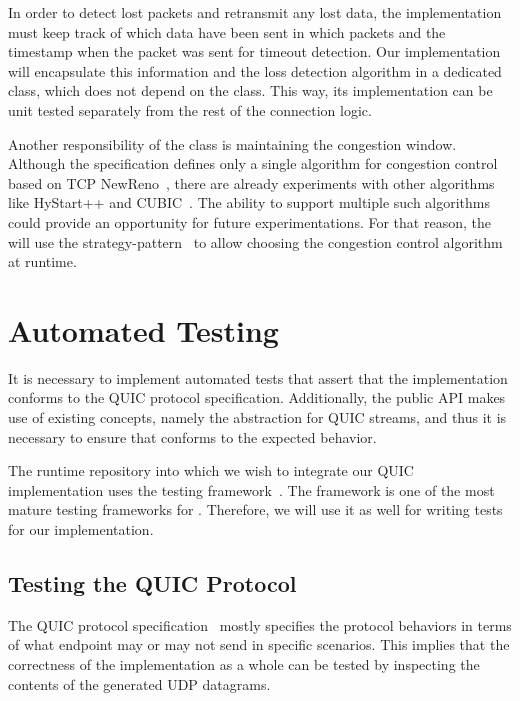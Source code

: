 In order to detect lost packets and retransmit any lost data, the \QuicConnection{} implementation
must keep track of which data have been sent in which packets and the timestamp when the packet was
sent for timeout detection. Our implementation will encapsulate this information and the loss
detection algorithm in a dedicated \RecoveryController{} class, which does not depend on the
\QuicConnection{} class. This way, its implementation can be unit tested separately from the rest of
the connection logic.

Another responsibility of the \RecoveryController{} class is maintaining the congestion window.
Although the specification defines only a single algorithm for congestion control based on TCP
NewReno~\autocite[Section~7]{draft-ietf-quic-recovery}, there are already experiments with other
algorithms like HyStart++ and CUBIC~\cite{cloudflareCubic}. The ability to support multiple such
algorithms could provide an opportunity for future experimentations. For that reason, the
\RecoveryController{} will use the \gls{strategy-pattern}~\cite{wiki:strategy-pattern} to allow
choosing the congestion control algorithm at runtime.

\section{Automated Testing}

It is necessary to implement automated tests that assert that the implementation conforms to the
QUIC protocol specification. Additionally, the public API makes use of existing concepts, namely the
 abstraction for QUIC streams, and thus it is necessary to ensure that \QuicStream{}
conforms to the expected  behavior.

The \dotnet{} runtime repository into which we wish to integrate our QUIC implementation uses the
\xUnit{} testing framework~\cite{xunit}. The \xUnit{} framework is one of the most mature testing
frameworks for \dotnet{}. Therefore, we will use it as well for writing tests for our
implementation.

\subsection{Testing the QUIC Protocol}

The QUIC protocol specification~\cite{draft-ietf-quic-transport} mostly specifies the protocol
behaviors in terms of what endpoint may or may not send in specific scenarios. This implies that the
correctness of the implementation as a whole can be tested by inspecting the contents of the
generated UDP datagrams.

